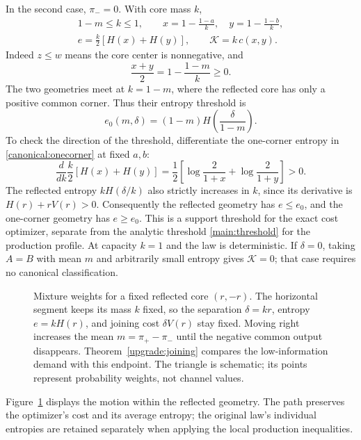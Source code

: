 In the second case, $\pi_-=0$.  With core mass $k$,
\begin{equation}
\begin{split}
 1-m\le k\le1,\qquad
 x=1-\frac{1-a}{k},\quad y=1-\frac{1-b}{k},\\
 e=\frac{k}{2}[H(x)+H(y)],\qquad
 \mathcal K=k\,c(x,y).
\end{split}
 \label{canonical:onecorner}
\end{equation}
Indeed $z\le w$ means the core center is nonnegative, and
\[
 \frac{x+y}{2}=1-\frac{1-m}{k}\ge0.
\]
The two geometries meet at $k=1-m$, where the reflected core has
only a positive common corner.  Thus their entropy threshold is
\begin{equation}
 e_0(m,\delta)=(1-m)H\!\left(\frac{\delta}{1-m}\right).
 \label{canonical:transition}
\end{equation}
To check the direction of the threshold, differentiate the one-corner
entropy in \eqref{canonical:onecorner} at fixed $a,b$:
\[
 \frac{d}{dk}\frac{k}{2}[H(x)+H(y)]
 =\frac12\left[\log\frac2{1+x}+\log\frac2{1+y}\right]>0.
\]
The reflected entropy $kH(\delta/k)$ also strictly increases in
$k$, since its derivative is $H(r)+rV(r)>0$.
Consequently the reflected geometry has $e\le e_0$, and the
one-corner geometry has $e\ge e_0$.  This is a support threshold
for the exact cost optimizer, separate from the analytic threshold
\eqref{main:threshold} for the production profile.
At capacity $k=1$ and the law is deterministic.
If $\delta=0$, taking $A=B$ with mean $m$ and
arbitrarily small entropy gives $\mathcal K=0$; that case requires
no canonical classification.


\begin{figure}[tb]
\centering

\caption{Mixture weights for a fixed reflected core $(r,-r)$.
The horizontal segment keeps its mass $k$ fixed, so the separation
$\delta=kr$, entropy $e=kH(r)$, and joining cost $\delta V(r)$ stay fixed.
Moving right increases the mean $m=\pi_+-\pi_-$ until the negative
common output disappears. Theorem~\ref{upgrade:joining} compares the
low-information demand with this endpoint. The triangle is schematic;
its points represent probability weights, not channel values.}
\label{fig:reflected-core}
\end{figure}

Figure~\ref{fig:reflected-core} displays the motion within the reflected
geometry. The path preserves the optimizer's cost and its average
entropy; the original law's individual entropies are retained separately
when applying the local production inequalities.
